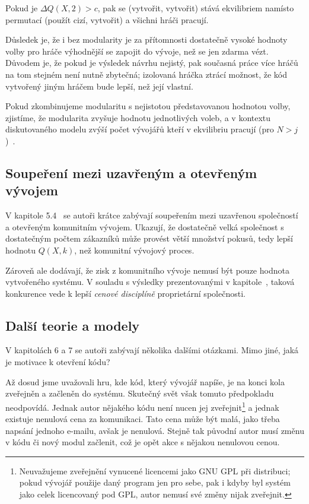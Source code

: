 \begin{multicols}{2}
		Pokud je $\Delta Q(X,2) > c$, pak se (vytvořit, vytvořit) stává ekvilibriem namísto permutací (použít cizí, vytvořit) a všichni hráči pracují.

		Důsledek je, že i bez modularity je za přítomnosti dostatečně vysoké hodnoty volby pro hráče výhodnější se zapojit do vývoje, než se jen zdarma vézt. Důvodem je, že pokud je výsledek návrhu nejistý, pak současná práce více hráčů na tom stejném není nutně zbytečná; izolovaná hráčka ztrácí možnost, že kód vytvořený jiným hráčem bude lepší, než její vlastní.

		Pokud zkombinujeme modularitu s nejistotou představovanou hodnotou volby, zjistíme, že modularita zvyšuje hodnotu jednotlivých voleb, a v kontextu diskutovaného modelu zvýší počet vývojářů kteří v ekvilibriu pracují (pro $N > j$)~\cite[kap. 5.2 a 5.3]{architecture-opensource}.

	\subsection*{Soupeření mezi uzavřeným a otevřeným vývojem}
		V kapitole 5.4~\cite{architecture-opensource} se autoři krátce zabývají soupeřením mezi uzavřenou společností a otevřeným komunitním vývojem. Ukazují, že dostatečně velká společnost s dostatečným počtem zákazníků může provést větší množství pokusů, tedy lepší hodnotu $Q(X,k)$, než komunitní vývojový proces.

		Zároveň ale dodávají, že zisk z komunitního vývoje nemusí být pouze hodnota vytvořeného systému. V souladu s výsledky prezentovanými v kapitole~, taková konkurence vede k lepší {\em cenové disciplíně} proprietární společnosti.

	\subsection*{Další teorie a modely}
		V kapitolách 6 a 7 se autoři zabývají několika dalšími otázkami. Mimo jiné, jaká je motivace k otevření kódu?

		Až dosud jsme uvažovali hru, kde kód, který vývojář napíše, je na konci kola zveřejněn a začleněn do systému. Skutečný svět však tomuto předpokladu neodpovídá. Jednak autor nějakého kódu není nucen jej zveřejnit\footnote{Neuvažujeme zveřejnění vynucené licencemi jako GNU GPL při distribuci; pokud vývojář použije daný program jen pro sebe, pak i kdyby byl systém jako celek licencovaný pod GPL, autor nemusí své změny nijak zveřejnit.} a jednak existuje nenulová cena za komunikaci. Tato cena může být malá, jako třeba napsání jednoho e-mailu, avšak je nenulová. Stejně tak původní autor musí změnu v kódu či nový modul začlenit, což je opět akce s nějakou nenulovou cenou.


\end{multicols}
